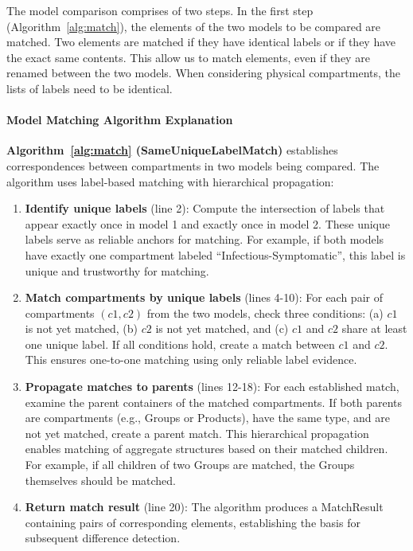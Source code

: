 The model comparison comprises of two steps. In the first step (Algorithm~\ref{alg:match}), the elements of the two models to be compared are matched. Two elements are matched if they have identical labels or if they have the exact same contents. This allow us to match elements, even if they are renamed between the two models. When considering physical compartments, the lists of labels need to be identical.

\paragraph{Model Matching Algorithm Explanation}

\textbf{Algorithm~\ref{alg:match} (SameUniqueLabelMatch)} establishes correspondences between compartments in two models being compared. The algorithm uses label-based matching with hierarchical propagation:

\begin{enumerate}
    \item \textbf{Identify unique labels} (line 2): Compute the intersection of labels that appear exactly once in model 1 and exactly once in model 2. These unique labels serve as reliable anchors for matching. For example, if both models have exactly one compartment labeled ``Infectious-Symptomatic'', this label is unique and trustworthy for matching.

    \item \textbf{Match compartments by unique labels} (lines 4-10): For each pair of compartments $(c1, c2)$ from the two models, check three conditions: (a) $c1$ is not yet matched, (b) $c2$ is not yet matched, and (c) $c1$ and $c2$ share at least one unique label. If all conditions hold, create a match between $c1$ and $c2$. This ensures one-to-one matching using only reliable label evidence.

    \item \textbf{Propagate matches to parents} (lines 12-18): For each established match, examine the parent containers of the matched compartments. If both parents are compartments (e.g., Groups or Products), have the same type, and are not yet matched, create a parent match. This hierarchical propagation enables matching of aggregate structures based on their matched children. For example, if all children of two Groups are matched, the Groups themselves should be matched.

    \item \textbf{Return match result} (line 20): The algorithm produces a MatchResult containing pairs of corresponding elements, establishing the basis for subsequent difference detection.
\end{enumerate}


